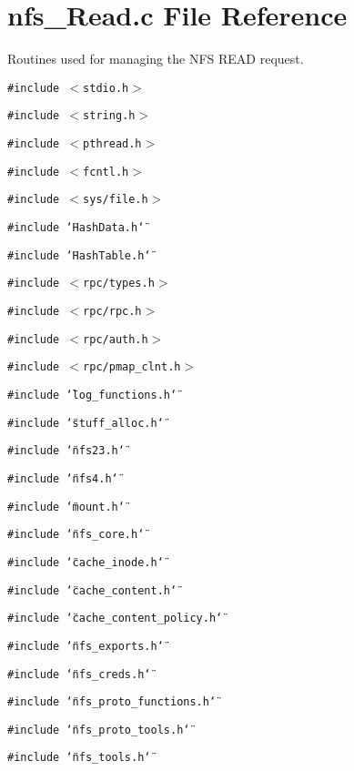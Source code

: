 \section{nfs\_\-Read.c File Reference}
\label{nfs__Read_8c}
Routines used for managing the NFS READ request. 

{\tt \#include $<$stdio.h$>$}\par
{\tt \#include $<$string.h$>$}\par
{\tt \#include $<$pthread.h$>$}\par
{\tt \#include $<$fcntl.h$>$}\par
{\tt \#include $<$sys/file.h$>$}\par
{\tt \#include \char`\"{}Hash\-Data.h\char`\"{}}\par
{\tt \#include \char`\"{}Hash\-Table.h\char`\"{}}\par
{\tt \#include $<$rpc/types.h$>$}\par
{\tt \#include $<$rpc/rpc.h$>$}\par
{\tt \#include $<$rpc/auth.h$>$}\par
{\tt \#include $<$rpc/pmap\_\-clnt.h$>$}\par
{\tt \#include \char`\"{}log\_\-functions.h\char`\"{}}\par
{\tt \#include \char`\"{}stuff\_\-alloc.h\char`\"{}}\par
{\tt \#include \char`\"{}nfs23.h\char`\"{}}\par
{\tt \#include \char`\"{}nfs4.h\char`\"{}}\par
{\tt \#include \char`\"{}mount.h\char`\"{}}\par
{\tt \#include \char`\"{}nfs\_\-core.h\char`\"{}}\par
{\tt \#include \char`\"{}cache\_\-inode.h\char`\"{}}\par
{\tt \#include \char`\"{}cache\_\-content.h\char`\"{}}\par
{\tt \#include \char`\"{}cache\_\-content\_\-policy.h\char`\"{}}\par
{\tt \#include \char`\"{}nfs\_\-exports.h\char`\"{}}\par
{\tt \#include \char`\"{}nfs\_\-creds.h\char`\"{}}\par
{\tt \#include \char`\"{}nfs\_\-proto\_\-functions.h\char`\"{}}\par
{\tt \#include \char`\"{}nfs\_\-proto\_\-tools.h\char`\"{}}\par
{\tt \#include \char`\"{}nfs\_\-tools.h\char`\"{}}\par
